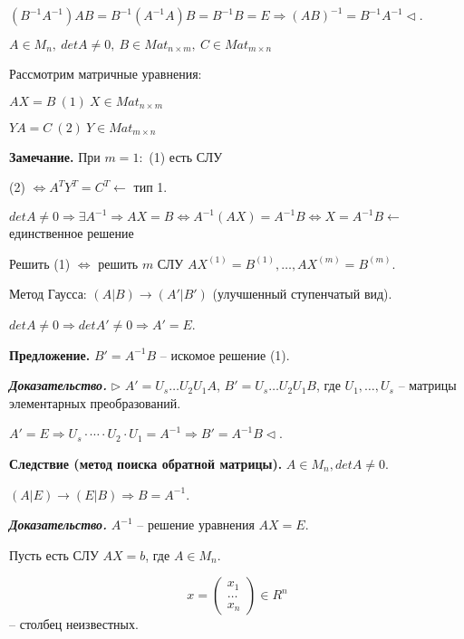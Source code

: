 $(B^{-1} A^{-1})AB = B^{-1} (A^{-1} A) B = B^{-1} B = E \Rightarrow (AB)^{-1} = B^{-1} A^{-1} \lhd$.

\vspace{\baselineskip}
$A \in M_n, \ detA \neq 0, \ B \in Mat_{n \times m}, \ C \in Mat_{m \times n}$

Рассмотрим матричные уравнения:

$AX = B \ (1) \ X \in Mat_{n \times m}$

$YA = C \ (2) \ Y \in Mat_{m \times n}$

\vspace{\baselineskip}
\textbf{Замечание.} При $m=1:$ (1) есть СЛУ

(2) $\Leftrightarrow A^T Y^T = C^T \leftarrow$ тип 1.

$detA \neq 0 \Rightarrow \exists A^{-1} \Rightarrow AX = B \Leftrightarrow A^{-1}(AX)=A^{-1}B \Leftrightarrow X = A^{-1}B \leftarrow$ единственное решение

Решить (1) $\Leftrightarrow$ решить $m$ СЛУ $AX^{(1)} = B^{(1)}, \dots, AX^{(m)} = B^{(m)}$.

\vspace{\baselineskip}
Метод Гаусса: $(A|B) \rightarrow (A'|B')$ (улучшенный ступенчатый вид).

$detA \neq 0 \Rightarrow detA' \neq 0 \Rightarrow A' = E$.

\vspace{\baselineskip}
\textbf{Предложение.} $B' = A^{-1}B$ -- искомое решение (1).

\vspace{\baselineskip}
\textbf{\textit{Доказательство.}} $\rhd$ $A' = U_s \dots U_2 U_1 A$, $B' = U_s \dots U_2 U_1 B$, где $U_1, \dots, U_s$ -- матрицы элементарных преобразований.

$A' = E \Rightarrow U_s \cdot \cdots \cdot U_2 \cdot U_1 = A^{-1} \Rightarrow B' = A^{-1}B \lhd$.

\vspace{\baselineskip}
\textbf{Следствие (метод поиска обратной матрицы).} $A \in M_n, det A \neq 0$.

$(A|E) \rightarrow (E|B) \Rightarrow B = A^{-1}$.

\vspace{\baselineskip}
\textbf{\textit{Доказательство.}} $A^{-1}$ -- решение уравнения $AX=E$.

\vspace{\baselineskip}
Пусть есть СЛУ $AX = b$, где $A \in M_n$. 

\begin{equation*}x = \begin{pmatrix} x_1 \\ \dots \\ x_n \end{pmatrix} \in R^n
\end{equation*} -- столбец неизвестных.

